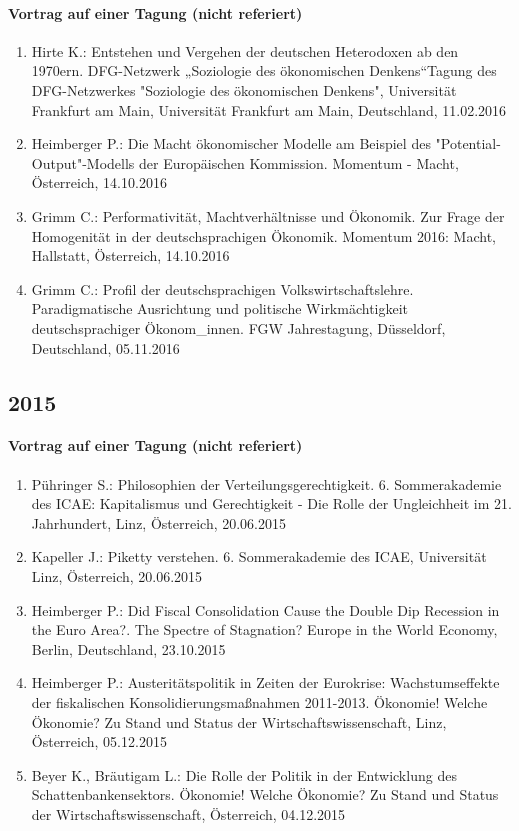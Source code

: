 \paragraph{Vortrag auf einer Tagung (nicht referiert)}
\begin{enumerate}
	\item Hirte K.: Entstehen und Vergehen der deutschen Heterodoxen ab den 1970ern. DFG-Netzwerk „Soziologie des ökonomischen Denkens“Tagung des DFG-Netzwerkes "Soziologie des ökonomischen Denkens", Universität Frankfurt am Main, Universität Frankfurt am Main, Deutschland, 11.02.2016
	\item Heimberger P.: Die Macht ökonomischer Modelle am Beispiel des "Potential-Output"-Modells der Europäischen Kommission. Momentum - Macht, Österreich, 14.10.2016
	\item Grimm C.: Performativität, Machtverhältnisse und Ökonomik. Zur Frage der Homogenität in der deutschsprachigen Ökonomik. Momentum 2016: Macht, Hallstatt, Österreich, 14.10.2016
	\item Grimm C.: Profil der deutschsprachigen Volkswirtschaftslehre. Paradigmatische Ausrichtung und politische Wirkmächtigkeit deutschsprachiger Ökonom_innen. FGW Jahrestagung, Düsseldorf, Deutschland, 05.11.2016
\end{enumerate}
\subsection*{2015}
\paragraph{Vortrag auf einer Tagung (nicht referiert)}
\begin{enumerate}
	\item Pühringer S.: Philosophien der Verteilungsgerechtigkeit. 6. Sommerakademie des ICAE: Kapitalismus und Gerechtigkeit - Die Rolle der Ungleichheit im 21. Jahrhundert, Linz, Österreich, 20.06.2015
	\item Kapeller J.: Piketty verstehen. 6. Sommerakademie des ICAE, Universität Linz, Österreich, 20.06.2015
	\item Heimberger P.: Did Fiscal Consolidation Cause the Double Dip Recession in the Euro Area?. The Spectre of Stagnation? Europe in the World Economy, Berlin, Deutschland, 23.10.2015
	\item Heimberger P.: Austeritätspolitik in Zeiten der Eurokrise: Wachstumseffekte der fiskalischen Konsolidierungsmaßnahmen 2011-2013. Ökonomie! Welche Ökonomie? Zu Stand und Status der Wirtschaftswissenschaft, Linz, Österreich, 05.12.2015
	\item Beyer K., Bräutigam L.: Die Rolle der Politik in der Entwicklung des Schattenbankensektors. Ökonomie! Welche Ökonomie? Zu Stand und Status der Wirtschaftswissenschaft, Österreich, 04.12.2015
\end{enumerate}

